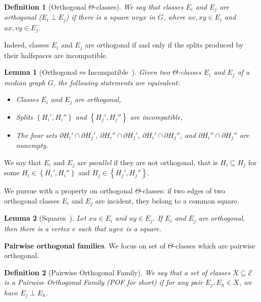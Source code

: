 \documentclass{article}
\newtheorem{definition}{Definition}
\newtheorem{lemma}{Lemma}
\newcommand{\set}[1]{\left\{ #1 \right\}}
\begin{document}
\begin{definition}[Orthogonal $\Theta$-classes]
We say that classes $E_i$ and $E_j$ are {\em orthogonal} ($E_i \perp E_j$) if there is a square $uvyx$ in $G$, where $uv,xy \in E_i$ and $ux,vy \in E_j$.
\end{definition}

Indeed, classes $E_i$ and $E_j$ are orthogonal if and only if the splits produced by their halfspaces are incompatible.

\begin{lemma}[Orthogonal$\Leftrightarrow$Incompatible~\cite{BeHa21}] Given two $\Theta$-classes $E_i$ and $E_j$ of a median graph $G$, the following statements are equivalent:
\begin{itemize}
    \item Classes $E_i$ and $E_j$ are orthogonal,
    \item Splits $\set{H_i',H_i''}$ and $\set{H_j',H_j''}$ are incompatible,
    \item The four sets $\partial H_i' \cap \partial H_j'$, $\partial H_i'' \cap \partial H_j'$, $\partial H_i' \cap \partial H_j''$, and $\partial H_i'' \cap \partial H_j''$ are nonempty.
\end{itemize}
\label{le:perp_incomp}
\end{lemma}

We say that $E_i$ and $E_j$ are \textit{parallel} if they are not orthogonal, that is $H_i \subseteq H_j$ for some $H_i \in \set{H_i',H_i''}$ and $H_j \in \set{H_j',H_j''}$. 

We pursue with a property on orthogonal $\Theta$-classes: if two edges of two orthogonal classes $E_i$ and $E_j$ are incident, they belong to a common square.

\begin{lemma}[Squares~\cite{BaCo93,BeHa21}]
Let $xu \in E_i$ and $uy \in E_j$. If $E_i$ and $E_j$ are orthogonal, then there is a vertex $v$ such that $uyvx$ is a square.
\label{le:squares}
\end{lemma}

\textbf{Pairwise orthogonal families}. We focus on set of $\Theta$-classes which are pairwise orthogonal.

\begin{definition}[Pairwise Orthogonal Family]
We say that a set of classes $X \subseteq \mathcal{E}$ is a {\em Pairwise Orthogonal Family (POF for short)} if for any pair $E_j,E_h \in X$, we have $E_j \perp E_h$.
\end{definition}
\end{document}

